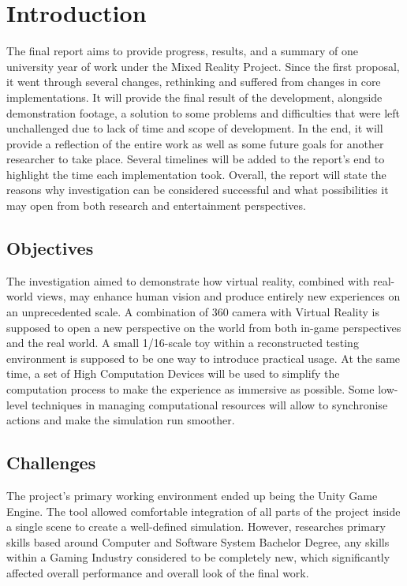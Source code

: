 \chapter{Introduction}
The final report aims to provide progress, results, and a summary of one university year of work under the Mixed Reality Project.
Since the first proposal, it went through several changes, rethinking and suffered from changes in core implementations.
It will provide the final result of the development, alongside demonstration footage, a solution to some problems and difficulties that were left unchallenged due to lack of time and scope of development.
In the end, it will provide a reflection of the entire work as well as some future goals for another researcher to take place.
Several timelines will be added to the report's end to highlight the time each implementation took.
Overall, the report will state the reasons why investigation can be considered successful and what possibilities it may open from both research and entertainment perspectives.
\section{Objectives}
The investigation aimed to demonstrate how virtual reality, combined with real-world views, may enhance human vision and produce entirely new experiences on an unprecedented scale.
A combination of 360 camera with Virtual Reality is supposed to open a new perspective on the world from both in-game perspectives and the real world.
A small 1/16-scale toy within a reconstructed testing environment is supposed to be one way to introduce practical usage.
At the same time, a set of High Computation Devices will be used to simplify the computation process to make the experience as immersive as possible.
Some low-level techniques in managing computational resources will allow to synchronise actions and make the simulation run smoother.
\section{Challenges}
The project's primary working environment ended up being the Unity Game Engine. The tool allowed comfortable integration of all parts of the project inside a single scene to create a well-defined simulation.
However, researches primary skills based around Computer and Software System Bachelor Degree, any skills within a Gaming Industry considered to be completely new, which significantly affected overall performance and overall look of the final work.

